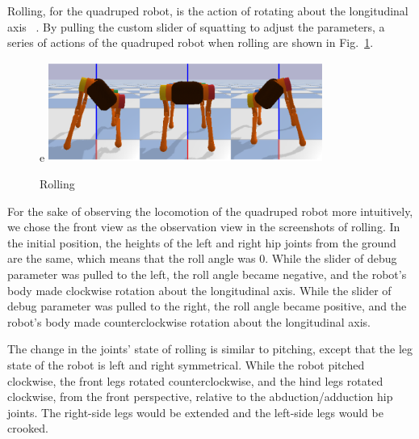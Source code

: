 Rolling, for the quadruped robot, is the action of rotating about the longitudinal axis ~\cite{ref:6DOF}. By pulling the custom slider of squatting to adjust the parameters, a series of actions of the quadruped robot when rolling are shown in Fig.~\ref{fig: rolling}.

\begin{figure}[htbp]e
    \centering
    \includegraphics[width=0.8\textwidth]{figures/rolling.png}
    \caption{Rolling}
    \label{fig: rolling}
\end{figure}

For the sake of observing the locomotion of the quadruped robot more intuitively, we chose the front view as the observation view in the screenshots of rolling. In the initial position, the heights of the left and right hip joints from the ground are the same, which means that the roll angle was 0. While the slider of debug parameter was pulled to the left, the roll angle became negative, and the robot's body made clockwise rotation about the longitudinal axis. While the slider of debug parameter was pulled to the right, the roll angle became positive, and the robot's body made counterclockwise rotation about the longitudinal axis.

The change in the joints' state of rolling is similar to pitching, except that the leg state of the robot is left and right symmetrical. While the robot pitched clockwise, the front legs rotated counterclockwise, and the hind legs rotated clockwise, from the front perspective, relative to the abduction/adduction hip joints. The right-side legs would be extended and the left-side legs would be crooked.

